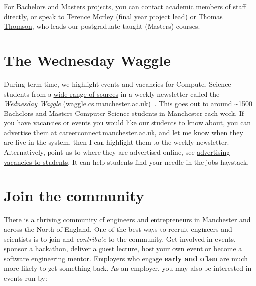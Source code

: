 \documentclass[
  12pt,
]{book}
\begin{document}
For Bachelors and Masters projects, you can contact academic members of staff directly, or speak to \href{https://research.manchester.ac.uk/en/persons/terence.morley}{Terence Morley} (final year project lead) or \href{https://research.manchester.ac.uk/en/persons/thomas.thomson}{Thomas Thomson}, who leads our postgraduate taught (Masters) courses.

\hypertarget{the-wednesday-waggle}{%
\section{The Wednesday Waggle}\label{the-wednesday-waggle}}

During term time, we highlight events and vacancies for Computer Science students from a \href{https://www.cdyf.me/finding}{wide range of sources} in a weekly newsletter called the \emph{Wednesday Waggle} (\href{https://waggle.cs.manchester.ac.uk/waggle/about}{waggle.cs.manchester.ac.uk}) 🐝. This goes out to around \textasciitilde1500 Bachelors and Masters Computer Science students in Manchester each week. If you have vacancies or events you would like our students to know about, you can advertise them at \href{https://careerconnect.manchester.ac.uk/}{careerconnect.manchester.ac.uk}, and let me know when they are live in the system, then I can highlight them to the weekly newsletter. Alternatively, point us to where they are advertised online, see \href{https://www.cdyf.me/finding\#studentjobs}{advertising vacancies to students}. It can help students find your needle in the jobs haystack.

\hypertarget{join-the-community}{%
\section{Join the community}\label{join-the-community}}

There is a thriving community of engineers and \href{https://www.accelerateme.co/}{entrepreneurs} in Manchester and across the North of England. One of the best ways to recruit engineers and scientists is to join and \emph{contribute} to the community. Get involved in events, \href{https://www.unicsmcr.com/}{sponsor a hackathon}, deliver a guest lecture, host your own event or \href{https://www.cs.manchester.ac.uk/connect/business-engagement/industrial-mentoring/}{become a software engineering mentor}. Employers who engage \textbf{early and often} are much more likely to get something back. As an employer, you may also be interested in events run by:
\end{document}
